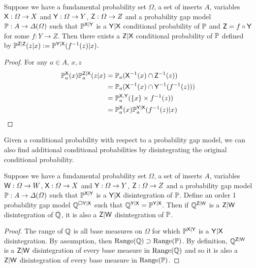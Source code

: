 \begin{theorem}\label{th:recurs_pushf}
Suppose we have a fundamental probability set $\Omega$, a set of inserts $A$, variables $\mathsf{X}:\Omega\to X$ and $\mathsf{Y}:\Omega\to Y$, $\mathsf{Z}:\Omega\to Z$ and a probability gap model $\mathbb{P}:A\to \Delta(\Omega)$ such that $\mathbb{P}^{\mathsf{X}|\mathsf{Y}}$ is a $\mathsf{Y}|\mathsf{X}$ conditional probability of $\mathbb{P}$ and $\mathsf{Z}=f\circ \mathsf{Y}$ for some $f:Y\to Z$. Then there exists a $\mathsf{Z}|\mathsf{X}$ conditional probability of $\mathbb{P}$ defined by $\mathbb{P}^{\mathsf{Z}|\mathsf{Z}}(z|x):=\mathbb{P}^{\mathsf{Y}|\mathsf{X}}(f^{-1}(z)|x)$.
\end{theorem}

\begin{proof}
For any $a\in A$, $x,z$
\begin{align}
\mathbb{P}_a^{\mathsf{X}}(x)\mathbb{P}_a^{\mathsf{Z}|\mathsf{X}}(z|x) &= \mathbb{P}_a(\mathsf{X}^{-1}(x)\cap\mathsf{Z}^{-1}(z))\\
					   &= \mathbb{P}_a(\mathsf{X}^{-1}(x)\cap\mathsf{Y}^{-1}(f^{-1}(z)))\\
					   &= \mathbb{P}_a^{\mathsf{X},\mathsf{Y}}(\{x\}\times f^{-1}(z))\\
					   &= \mathbb{P}_a^{\mathsf{X}}(x)\mathbb{P}_a^{\mathsf{Y}|\mathsf{X}}(f^{-1}(z)|x)
\end{align}
\end{proof}

Given a conditional probability with respect to a probability gap model, we can also find additional conditional probabilities by disintegrating the original conditional probability.


\begin{theorem}\label{th:recursive-disint}
Suppose we have a fundamental probability set $\Omega$, a set of inserts $A$, variables $\mathsf{W}:\Omega\to W$, $\mathsf{X}:\Omega\to X$ and $\mathsf{Y}:\Omega\to Y$, $\mathsf{Z}:\Omega\to Z$ and a probability gap model $\mathbb{P}:A\to \Delta(\Omega)$ such that $\mathbb{P}^{\mathsf{X}|\mathsf{Y}}$ is a $\mathsf{Y}|\mathsf{X}$ disintegration of $\mathbb{P}$. Define an order 1 probability gap model $\mathbb{Q}^{\square \mathsf{Y}|\mathsf{X}}$ such that $\mathbb{Q}^{\mathsf{Y}|\mathsf{X}}=\mathbb{P}^{\mathsf{Y}|\mathsf{X}}$. Then if $\mathbb{Q}^{\mathsf{Z}|\mathsf{W}}$ is a $\mathsf{Z}|\mathsf{W}$ disintegration of $\mathbb{Q}$, it is also a $\mathsf{Z}|\mathsf{W}$ disintegration of $\mathbb{P}$.
\end{theorem}

\begin{proof}
The range of $\mathbb{Q}$ is all base measures on $\Omega$ for which $\mathbb{P}^{\mathsf{X}|\mathsf{Y}}$ is a $\mathsf{Y}|\mathsf{X}$ disintegration. By assumption, then $\text{Range}(\mathbb{Q})\supset\text{Range}(\mathbb{P})$. By definition, $\mathbb{Q}^{\mathsf{Z}|\mathsf{W}}$ is a $\mathsf{Z}|\mathsf{W}$ disintegration of every base measure in $\text{Range}(\mathbb{Q})$ and so it is also a $\mathsf{Z}|\mathsf{W}$ disintegration of every base measure in $\text{Range}(\mathbb{P})$.
\end{proof}

